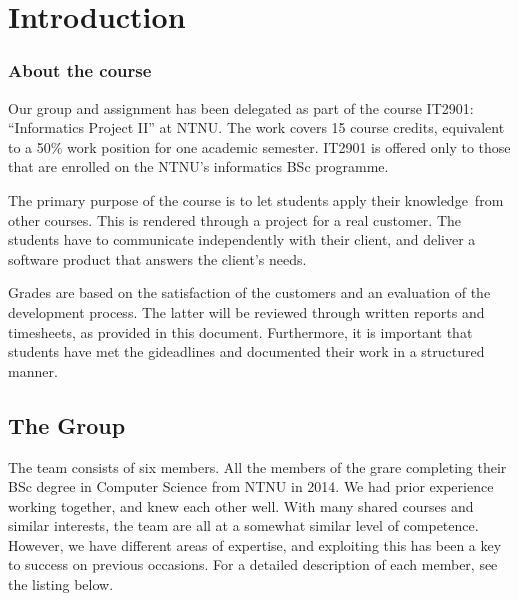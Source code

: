 \section{Introduction}
\subsubsection{About the course}
Our group and assignment has been delegated as part of the course
IT2901: ``Informatics Project II''
at NTNU. The work covers 15 course credits, equivalent to a 50\% work
position for one academic semester. IT2901 is offered only to those
that are enrolled on the NTNU's informatics BSc
programme.

The primary purpose of the course is to let students apply their
knowledge\ from other courses. This is rendered through a project for a
real customer. The students have to communicate independently with
their client, and deliver a software product that answers the
client's needs. 

Grades are based on the satisfaction of the customers and an evaluation
of the development process. The latter will be reviewed through written
reports and timesheets, as provided in this document. Furthermore, it
is important that students have met the gi\ven deadlines and documented
their work in a structured manner.

\subsection{The Group}

The team consists of six members. All the members of the gr\oup are
completing their BSc degree in Computer Science from NTNU in 2014. We
had prior experience working together, and knew each other well. With
many shared courses and similar interests, the team are all at a
somewhat similar level of competence. However, we have different areas
of expertise, and exploiting this has been a key to success on previous
occasions. For a detailed description of each member, see the listing
below.

